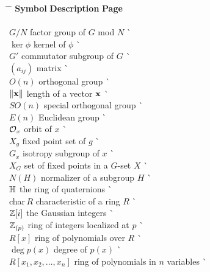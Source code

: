 \begin{tabbing}
\hspace{1.5in} \= \hspace{2.5in} \= \kill
{\bf Symbol}  \> {\bf Description} \>  \` {\bf Page} \\ 
     \mbox{\hspace*{1in}} \\
$G/N$ \> factor group of $G$ mod $N$ \> \` \pageref{notefactor} \\
$\ker \phi$ \> kernel of $\phi$ \> \` \pageref{kernelofphi} \\
$G'$ \> commutator subgroup of $G$ \> \` \pageref{commutatorsubgroup} \\
$(a_{ij})$ \> matrix \> \` \pageref{matrixnote} \\
$O(n)$ \> orthogonal group \> \` \pageref{noteorthogonal} \\
$\| {\bold x} \|$ \> length of a vector ${\bold x}$ \> 
     \` \pageref{notelengthvect} \\
$SO(n)$ \> special orthogonal group \> \` \pageref{notespecialorthog} \\
$E(n)$ \> Euclidean group \> \` \pageref{noteeuclidgroup} \\
${\cal O}_x$ \> orbit of $x$ \> \` \pageref{noteorbit} \\
$X_g$ \> fixed point set of $g$ \> \` \pageref{notefixed} \\
$G_x$ \> isotropy subgroup of $x$ \> \` \pageref{noteisotropy} \\
$X_G$ \> set of fixed points in a $G$-set $X$ \> 
     \` \pageref{noteXG} \\
$N(H)$ \> normalizer of a subgroup $H$ \> 
     \` \pageref{notenormalizer} \\ 
${\Bbb H}$ \> the ring of quaternions \> \` \pageref{noteringH} \\
\mbox{char$\, R$} \> characteristic of a ring $R$ \> \` \pageref{ringchar} \\
${\Bbb Z}[i ]$ \> the Gaussian integers \> \` \pageref{gaussianintegers} \\
${\Bbb Z}_{(p)}$ \> ring of integers localized at $p$ \> 
     \` \pageref{notelocalint} \\
$R[x]$ \> ring of polynomials over $R$ \> 
     \` \pageref{polynomialring} \\
$\deg p(x)$ \> degree of $p(x)$ \> \` \pageref{polydegree} \\
$R[x_1, x_2, \ldots, x_n]$ \> ring of polynomials in $n$ variables \>
     \` \pageref{notepolynvar} \\

\end{tabbing}
